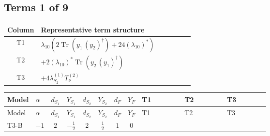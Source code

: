 \documentclass[8pt]{article}
\begin{document}
\begin{landscape}
\subsection*{Terms 1 of 9}
\begin{center}
\begin{tabular}{@{}c >{\raggedright\arraybackslash}p{0.82\linewidth}@{}}
\toprule
Column & Representative term structure \\
\midrule
T1 & \(\displaystyle {\lambda_{10}} (2 \operatorname{Tr}\!\left({y_1}\,\left({y_2}\right)^{\dagger}\right)+24 \left({\lambda_{10}}\right)^{*})\) \\
\midrule
T2 & \(\displaystyle +2 \left({\lambda_{10}}\right)^{*} \operatorname{Tr}\!\left({y_2}\,\left({y_1}\right)^{\dagger}\right)\) \\
\midrule
T3 & \(\displaystyle +4 {\lambda_{S_2}^{(1)}} T_{\nu}^{(2)}\) \\
\midrule
\bottomrule
\end{tabular}
\end{center}
\smallskip
\tiny
\begin{longtable}{@{}llcccccc >{\raggedright\arraybackslash}p{0.21\linewidth} >{\raggedright\arraybackslash}p{0.21\linewidth} >{\raggedright\arraybackslash}p{0.21\linewidth}@{}}
\toprule
Model & $\alpha$ & $d_{S_1}$ & $Y_{S_1}$ & $d_{S_2}$ & $Y_{S_2}$ & $d_F$ & $Y_F$ & T1 & T2 & T3 \\
\midrule
\endfirsthead
\toprule
Model & $\alpha$ & $d_{S_1}$ & $Y_{S_1}$ & $d_{S_2}$ & $Y_{S_2}$ & $d_F$ & $Y_F$ & T1 & T2 & T3 \\
\midrule
\endhead
T3-B & $-1$ & $2$ & $-\frac{1}{2}$ & $2$ & $\frac{1}{2}$ & $1$ & $0$ & \scriptsize\adjustbox{max width=\linewidth}{$\begin{gathered} {\lambda_{10}} (2 \operatorname{Tr}\!\left({y_1}\,\left({y_2}\right)^{\dagger}\right)+24 \left({\lambda_{10}}\right)^{*})\end{gathered}$} & \scriptsize\adjustbox{max width=\linewidth}{$\begin{gathered} +2 \left({\lambda_{10}}\right)^{*} \operatorname{Tr}\!\left({y_2}\,\left({y_1}\right)^{\dagger}\right)\end{gathered}$} & \scriptsize\adjustbox{max width=\linewidth}{$\begin{gathered} +4 {\lambda_{S_2}^{(1)}} T_{\nu}^{(2)}\end{gathered}$} \\
\midrule

\end{longtable}
\end{landscape}
\end{document}

